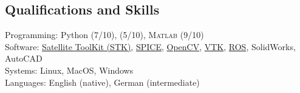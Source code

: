 \subsection*{Qualifications and Skills}
{}

Programming: Python (7/10), \CC (5/10), \textsc{Matlab} (9/10) \\
Software: \href{http://www.agi.com/products/engineering-tools}{Satellite ToolKit (STK)}, \href{https://naif.jpl.nasa.gov/naif/toolkit.html}{SPICE}, \href{https://opencv.org/}{OpenCV}, \href{https://www.vtk.org}{VTK}, \href{http://www.ros.org}{ROS}, SolidWorks, AutoCAD \\
Systems: Linux, MacOS, Windows \\
Languages: English (native), German (intermediate)
